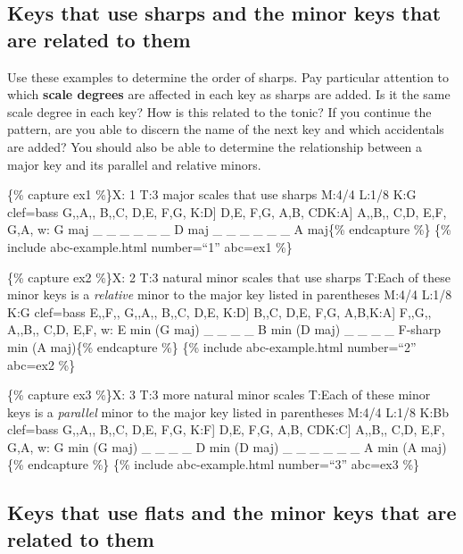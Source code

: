 \documentclass{book}
\begin{document}
\hypertarget{keys-that-use-sharps-and-the-minor-keys-that-are-related-to-them}{%
\subsection{Keys that use sharps and the minor keys that are related to
them}\label{keys-that-use-sharps-and-the-minor-keys-that-are-related-to-them}}

Use these examples to determine the order of sharps. Pay particular attention
to which \textbf{scale degrees} are affected in each key as sharps are added.
Is it the same scale degree in each key? How is this related to the tonic? If
you continue the pattern, are you able to discern the name of the next key and
which accidentals are added? You should also be able to determine the
relationship between a major key and its parallel and relative minors.

\{\% capture ex1 \%\}X: 1 T:3 major scales that use sharps M:4/4 L:1/8 K:G
clef=bass G,,A,, B,,C, D,E, F,G, \textbar\textbar{[}K:D{]} D,E, F,G, A,B,
CD\textbar\textbar{[}K:A{]} A,,B,, C,D, E,F, G,A,\textbar{]} w: G maj \_ \_ \_
\_ \_ \_ D maj \_ \_ \_ \_ \_ \_ A maj\{\% endcapture \%\} \{\% include
abc-example.html number=``1'' abc=ex1 \%\}

\{\% capture ex2 \%\}X: 2 T:3 natural minor scales that use sharps T:Each of
these minor keys is a \emph{relative} minor to the major key listed in
parentheses M:4/4 L:1/8 K:G clef=bass E,,F,, G,,A,, B,,C, D,E,
\textbar\textbar{[}K:D{]} B,,C, D,E, F,G, A,B,\textbar\textbar{[}K:A{]} F,,G,,
A,,B,, C,D, E,F,\textbar{]} w: E min (G maj) \_ \_ \_ \_ B min (D maj) \_ \_
\_ \_ F-sharp min (A maj)\{\% endcapture \%\} \{\% include abc-example.html
number=``2'' abc=ex2 \%\}

\{\% capture ex3 \%\}X: 3 T:3 more natural minor scales T:Each of these minor
keys is a \emph{parallel} minor to the major key listed in parentheses M:4/4
L:1/8 K:Bb clef=bass G,,A,, B,,C, D,E, F,G, \textbar\textbar{[}K:F{]} D,E,
F,G, A,B, CD\textbar\textbar{[}K:C{]} A,,B,, C,D, E,F, G,A,\textbar{]} w: G
min (G maj) \_ \_ \_ \_ D min (D maj) \_ \_ \_ \_ \_ \_ A min (A maj)\{\%
endcapture \%\} \{\% include abc-example.html number=``3'' abc=ex3 \%\}

\hypertarget{keys-that-use-flats-and-the-minor-keys-that-are-related-to-them}{%
\subsection{Keys that use flats and the minor keys that are related to
them}\label{keys-that-use-flats-and-the-minor-keys-that-are-related-to-them}}
\end{document}

